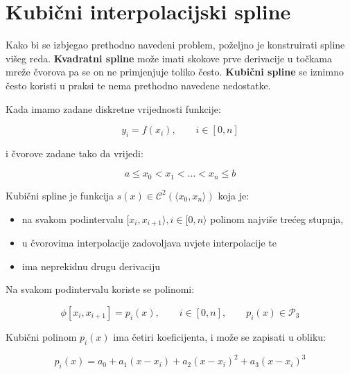 
\section{Kubični interpolacijski spline}

Kako bi se izbjegao prethodno navedeni problem, poželjno je konstruirati spline višeg reda.
\textbf{Kvadratni spline} može imati skokove prve derivacije u točkama mreže čvorova pa se on ne primjenjuje toliko često.
\textbf{Kubični spline} se iznimno često koristi u praksi te nema prethodno navedene nedostatke.

Kada imamo zadane diskretne vrijednosti funkcije:

\begin{equation*}
y_i=f(x_i),\qquad i\in[0,n]
\end{equation*}

i čvorove zadane tako da vrijedi:

$$
a\leq x_0 < x_1 < \dots < x_n \leq b
$$

Kubični spline je funkcija $s(x)\in\mathcal{C}^2(\langle x_0,x_n\rangle)$ koja je:

\begin{itemize}
    \item na svakom podintervalu $[x_i, x_{i+1}\rangle, i\in[0,n\rangle$ polinom najviše trećeg stupnja,
    \item u čvorovima interpolacije zadovoljava uvjete interpolacije te
    \item ima neprekidnu drugu derivaciju
\end{itemize}

Na svakom podintervalu koriste se polinomi:

\begin{equation*}
\phi[x_i,x_{i+1}] = p_i(x),\qquad i\in[0,n],\qquad p_i(x)\in\mathcal{P}_3
\end{equation*}

Kubični polinom $p_i(x)$ ima četiri koeficijenta, i može se zapisati u obliku:

$$
p_i(x)=a_0+a_1(x-x_i)+a_2(x-x_i)^2+a_3(x-x_i)^3
$$

